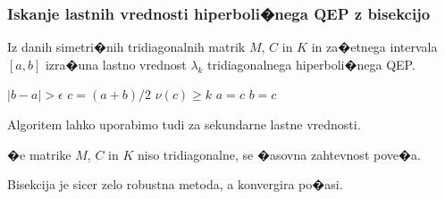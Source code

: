 \documentclass[9pt]{beamer}
\begin{document}
\begin{frame}
\frametitle{Iskanje lastnih vrednosti hiperboli�nega QEP z bisekcijo}

Iz danih simetri�nih tridiagonalnih matrik
$M$, $C$ in $K$ in za�etnega intervala $[a,b]$ izra�una lastno
vrednost $\lambda_k$ tridiagonalnega hiperboli�nega QEP.

\hbox{} $|b-a|>\epsilon$\newline
\hbox{}\qquad\qquad $c=(a+b)/2$\newline
\hbox{}\qquad{} $\nu(c)\ge k$\newline
\hbox{}\qquad\qquad\qquad $a=c$\newline
\hbox{}\qquad{}\newline
\hbox{}\qquad\qquad\qquad $b=c$\newline\pause

Algoritem lahko uporabimo tudi za
sekundarne lastne vrednosti.\vspace{1em}

�e matrike $M$, $C$ in $K$ niso tridiagonalne, se �asovna
zahtevnost  pove�a.\vspace{1em}

Bisekcija je sicer zelo robustna metoda, a konvergira po�asi.
\end{frame}
\end{document}
